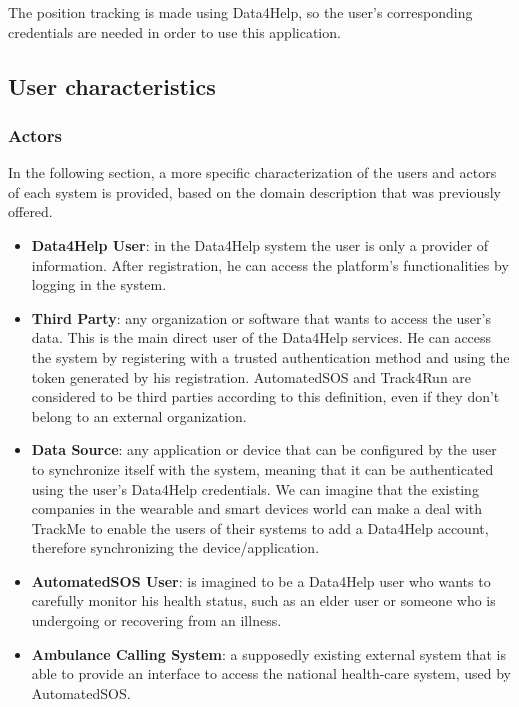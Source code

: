 The position tracking is made using Data4Help, so the user's corresponding credentials are needed in order to use this application.

\subsection{User characteristics}

\subsubsection{Actors}
In the following section, a more specific characterization of the users and actors of each system is provided, based on the domain description that was previously offered.

\begin{itemize}
\item \textbf{Data4Help User}: in the Data4Help system the user is only a provider of information. After registration, he can access the platform's functionalities by logging in the system.
 
\item \textbf{Third Party}: any organization or software that wants to access the user's data. This is the main direct user of the Data4Help services. He can access the system by registering with a trusted authentication method and using the token generated by his registration. 
AutomatedSOS and Track4Run are considered to be third parties according to this definition, even if they don't belong to an external organization.

\item \textbf{Data Source}: any application or device that can be configured by the user to synchronize itself with the system, meaning that it can be authenticated using the user's Data4Help credentials.
We can imagine that the existing companies in the wearable and smart devices world can make a deal with TrackMe to enable the users of their systems to add a Data4Help account, therefore synchronizing the device/application. 

\item \textbf{AutomatedSOS User}: is imagined to be a Data4Help user who wants to carefully monitor his health status, such as an elder user or someone who is undergoing or recovering from an illness.

\item \textbf{Ambulance Calling System}: a supposedly existing external system that is able to provide an interface to access the national health-care system, used by AutomatedSOS.


\end{itemize}
